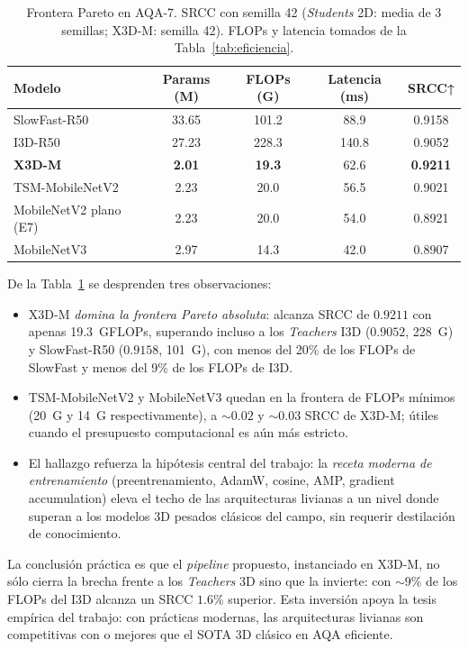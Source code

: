 \begin{table}[H]
\centering
\caption{Frontera Pareto en AQA-7. SRCC con semilla 42 (\textit{Students} 2D: media de 3 semillas; X3D-M: semilla 42). FLOPs y latencia tomados de la Tabla~\ref{tab:eficiencia}.}
\label{tab:pareto}
\small
\begin{tabular}{lcccc}
\toprule
\textbf{Modelo} & \textbf{Params (M)} & \textbf{FLOPs (G)} & \textbf{Latencia (ms)} & \textbf{SRCC}↑ \\
\midrule
SlowFast-R50    & 33.65 & 101.2     & 88.9   & 0.9158 \\
I3D-R50         & 27.23 & 228.3     & 140.8  & 0.9052 \\
\midrule
\textbf{X3D-M}  & \textbf{2.01} & \textbf{19.3} & 62.6  & \textbf{0.9211} \\
TSM-MobileNetV2 & 2.23  & 20.0      & 56.5   & 0.9021 \\
MobileNetV2 plano (E7) & 2.23 & 20.0 & 54.0  & 0.8921 \\
MobileNetV3     & 2.97  & 14.3      & 42.0   & 0.8907 \\
\bottomrule
\end{tabular}
\end{table}

De la Tabla~\ref{tab:pareto} se desprenden tres observaciones:

\begin{itemize}
    \item X3D-M \emph{domina la frontera Pareto absoluta}: alcanza \ac{SRCC} de $0.9211$ con apenas 19.3~GFLOPs, superando incluso a los \textit{Teachers} \ac{I3D} ($0.9052$, 228~G) y SlowFast-R50 ($0.9158$, 101~G), con menos del 20\% de los \ac{FLOPs} de SlowFast y menos del 9\% de los \ac{FLOPs} de \ac{I3D}.
    \item TSM-MobileNetV2 y MobileNetV3 quedan en la frontera de \ac{FLOPs} mínimos (20~G y 14~G respectivamente), a $\sim 0.02$ y $\sim 0.03$ \ac{SRCC} de X3D-M; útiles cuando el presupuesto computacional es aún más estricto.
    \item El hallazgo refuerza la hipótesis central del trabajo: la \emph{receta moderna de entrenamiento} (preentrenamiento, AdamW, cosine, AMP, gradient accumulation) eleva el techo de las arquitecturas livianas a un nivel donde superan a los modelos 3D pesados clásicos del campo, sin requerir destilación de conocimiento.
\end{itemize}

La conclusión práctica es que el \textit{pipeline} propuesto, instanciado en X3D-M, no sólo cierra la brecha frente a los \textit{Teachers} 3D sino que la invierte: con $\sim 9\%$ de los \ac{FLOPs} del \ac{I3D} alcanza un \ac{SRCC} $1.6\%$ superior. Esta inversión apoya la tesis empírica del trabajo: con prácticas modernas, las arquitecturas livianas son competitivas con o mejores que el SOTA 3D clásico en \ac{AQA} eficiente.

